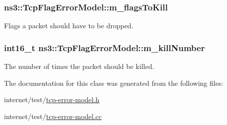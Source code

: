 \subsubsection[{\texorpdfstring{m\+\_\+flags\+To\+Kill}{m_flagsToKill}}]{ ns3\+::\+Tcp\+Flag\+Error\+Model\+::m\+\_\+flags\+To\+Kill\hspace{0.3cm}{\ttfamily [protected]}}\hypertarget{classns3_1_1TcpFlagErrorModel_a153c832e564ee9d42c2a4f8adbdac406}{}\label{classns3_1_1TcpFlagErrorModel_a153c832e564ee9d42c2a4f8adbdac406}


Flags a packet should have to be dropped. 

\subsubsection[{\texorpdfstring{m\+\_\+kill\+Number}{m_killNumber}}]{\setlength{\rightskip}{0pt plus 5cm}int16\+\_\+t ns3\+::\+Tcp\+Flag\+Error\+Model\+::m\+\_\+kill\+Number\hspace{0.3cm}{\ttfamily [protected]}}\hypertarget{classns3_1_1TcpFlagErrorModel_adc3115afebce5f5e0027b5dbb22b9a6b}{}\label{classns3_1_1TcpFlagErrorModel_adc3115afebce5f5e0027b5dbb22b9a6b}


The number of times the packet should be killed. 



The documentation for this class was generated from the following files\+:\begin{DoxyCompactItemize}
\item 
internet/test/\hyperlink{tcp-error-model_8h}{tcp-\/error-\/model.\+h}\item 
internet/test/\hyperlink{tcp-error-model_8cc}{tcp-\/error-\/model.\+cc}\end{DoxyCompactItemize}
